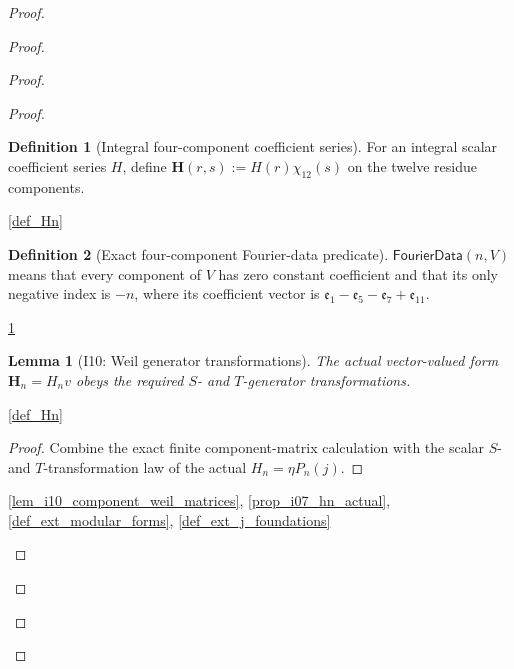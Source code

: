 \documentclass[11pt,a4paper]{article}
\numberwithin{equation}{section}
\theoremstyle{plain}\newtheorem{theorem}{Theorem}[section]\newaliascnt{proposition}{theorem}\newtheorem{proposition}[proposition]{Proposition}\aliascntresetthe{proposition}\newaliascnt{lemma}{theorem}\newtheorem{lemma}[lemma]{Lemma}\aliascntresetthe{lemma}
\theoremstyle{definition}\newaliascnt{definition}{theorem}\newtheorem{definition}[definition]{Definition}\aliascntresetthe{definition}\newaliascnt{notation}{theorem}\newtheorem{notation}[notation]{Notation}\aliascntresetthe{notation}
\providecommand{\lean}[1]{}\providecommand{\leanok}{}
\begin{document}
\begin{proof}
\begin{proof}
\begin{proof}
\begin{proof}
\begin{definition}[Integral four-component coefficient series]\label{def_i10_four_component_series}\lean{SptCM.Analytic.Repaired.fourComponentHSeries}\leanok
For an integral scalar coefficient series \(H\), define
\(\mathbf H(r,s):=H(r)\chi_{12}(s)\) on the twelve residue components.
\end{definition}
\begin{uses-statement}\ref{def_Hn}\end{uses-statement}

\begin{definition}[Exact four-component Fourier-data predicate]\label{def_i10_fourier_data}\lean{SptCM.Analytic.Repaired.HasFourComponentFourierData}\leanok
\(\mathsf{FourierData}(n,V)\) means that every component of \(V\) has zero
constant coefficient and that its only negative index is \(-n\), where its
coefficient vector is
\(\mathfrak e_1-\mathfrak e_5-\mathfrak e_7+\mathfrak e_{11}\).
\end{definition}
\begin{uses-statement}\ref{def_i10_four_component_series}\end{uses-statement}

\begin{lemma}[I10: Weil generator transformations]\label{lem_i10_weil_generators}\lean{SptCM.Analytic.Repaired.auxiliaryHn_weil_generators}\leanok
The actual vector-valued form $\mathbf H_n=H_nv$ obeys the required $S$- and $T$-generator transformations.
\end{lemma}
\begin{uses-statement}\ref{def_Hn}\end{uses-statement}
\begin{proof}Combine the exact finite component-matrix calculation with the
scalar $S$- and $T$-transformation law of the actual $H_n=\eta P_n(j)$.\end{proof}
\begin{uses-proof}\ref{lem_i10_component_weil_matrices}, \ref{prop_i07_hn_actual}, \ref{def_ext_modular_forms}, \ref{def_ext_j_foundations}\end{uses-proof}


\end{proof}
\end{proof}
\end{proof}
\end{proof}
\end{document}
